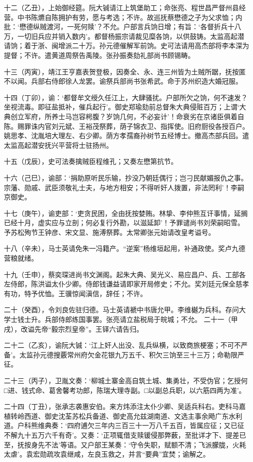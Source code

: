 \documentclass[]{article}
\begin{document}
十二（乙丑），上始御经筵。阮大铖请江上筑堡助工；命张亮、程世昌严督州县经营。中书陈爊自陈拥护有劳，愿与考选；不许。故巡抚蔡懋德之子为父求恤；内批：`懋德纵贼渡河，一死何赎'？不允。户部言兵饷日增；有旨：`各督折兵十八万，一切旧兵应并销入数内'。都督杨振宗请裁见糜各饷，以供鼓铸。太监高起潜请饷；着于浙、闽增派二十万。孙元德催解军前饷。史可法请用高杰部将李本深为提督；不许。遣黄道周祭告禹陵。张孙振奏劾礼部尚书顾锡畴。

十三（丙寅），靖江王亨嘉表贺登极，因奏全、永、连三州皆为土贼所踞，抚按匿不以闻。兵部右侍郎徐人龙罢。谕祭兵部尚书张希武。命于苏州织造大婚冠服。

十四（丁卯），谕：`都督牟文绶久任江上，大肆骚扰。户部所欠之饷，何不速发？坐视流毒。即征盐抵补，催兵起行'。御史郑瑜劾前总督朱大典侵赃百万；上谓`大典创立军府，所养士马岂容枵腹？岁饷几何，不必妄计'！命衰劣在京诸臣俱着自陈。赐罪诛内官刘元斌、王裕茂祭葬，荫子锦衣卫、指挥使。旧府厨役各授百户。姚思孝、沈胤培大理左、右少卿。荫方孝孺裔孙树节五经博士。撤高杰部兵回。遣太监高起潜安抚兴平营将士驻扬州。

十五（戊辰），史可法奏擒贼臣程维孔；又奏左懋第抗节。

十六（己巳），谕部：`捐助原听民乐输，抄没乃朝廷偶行；岂刁民献媚报仇之事。宗藩、勋戚、武臣须敬礼士夫，与地方相安；不得听奸人拨置，非法罔利'！李嗣京御史。

十七（庚午），谕吏部：`吏贪民困，全由抚按婪贿。林挚、李仲熊互讦事情，延搁已经十月，虚实应与立剖；何必复行外勘，以滋延卸'！予罪谴尚书刘荣嗣昭雪。予苏松殉节王钟彦、宋文显、施溥祭葬。太常卿张元始请改皇考谥号。

十八（辛未），马士英请免朱一冯籍产。``逆案''杨维垣起用，补通政使。奖卢九德营粮就绪。

十九（壬申），蔡奕琛进尚书文渊阁。起朱大典、吴光义、易应昌户、兵、工部各左侍郎，陈洪谥太仆少卿。侍郎钱谦益请即家开局修史；不允。奖刘廷元保全慈孝有功，特予优恤。王骥惊闻滇信，辞任；不许。

二十（癸酉），令刘良佐驻归德。马士英请褫中书唐允甲。李维樾为兵科。存问大学士钱士升。兵部侍郎练国事罢。张亮请立盐税局于皖城；不允。
二十一（甲戌），改谥先帝``毅宗烈皇帝''。王铎六请告归。

二十二（乙亥），谕阮大铖：`江上奸人出没、乱兵纵横，以致商旅梗塞；不可不严备'。太监孙元德搜覈常州府欠金花银九万五千、积欠三饷至三十三万；命勒限严征。

二十三（丙子），卫胤文奏：`柳城土寨金高自筑土城、集勇壮，不受伪官；乞授何□进、钱式命、葛舍馨考功郎，陈瑞大理寺副。□以副总兵职，以六筋四两为准'。

二十四（丁丑），张承志袭惠安伯。来方炜添注太仆少卿、吴适兵科右。吏科马嘉植转岭西道、御史沈荃苏松兵备道、御史高允兹湖南道、文选主事余飏广东水利道。户科熊维典奏：`四府逋欠三年内三百三十一万八千五百，皆属应征；又已征不解九十五万六千有奇'。又奏：`正项辄借支赎锾侵那弊薮，至批详才下、提差已至，抚按身先不法'等语。又户部王某奏：`守令失职，赋额不清；飞派朦胧，火耗太虐'。袁宏勋疏攻袁继咸，左良玉救之，并言``要典''宜焚；谕解之。
\end{document}
